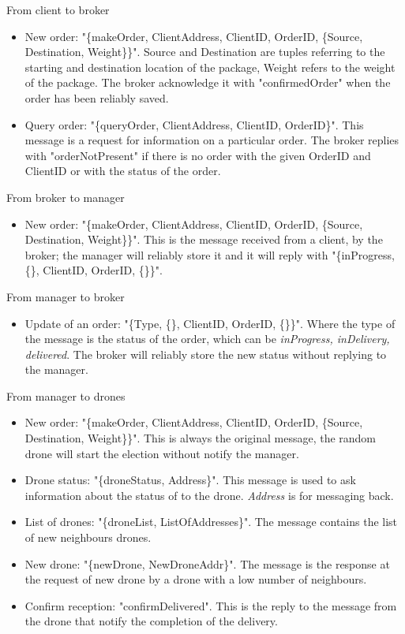 \documentclass[a4paper, oneside]{memoir}
\begin{document}
From client to broker
\begin{itemize}
	\item New order: "\{makeOrder, ClientAddress, ClientID, OrderID, \{Source, Destination, Weight\}\}".
	Source and Destination are tuples referring to the starting and destination location of the package, Weight refers to the weight of the package. The broker acknowledge it with "confirmedOrder" when the order has been reliably saved.

	\item Query order: "\{queryOrder, ClientAddress, ClientID, OrderID\}".
	This message is a request for information on a particular order. The broker replies with "orderNotPresent" if there is no order with the given OrderID and ClientID or with the status of the order.
\end{itemize} \vspace{1em}
From broker to manager
\begin{itemize}
	\item New order: "\{makeOrder, ClientAddress, ClientID, OrderID, \{Source, Destination, Weight\}\}".
	This is the message received from a client, by the broker; the manager will reliably store it and it will reply with "\{inProgress, \{\}, ClientID, OrderID, \{\}\}".
\end{itemize} \vspace{1em}
From manager to broker
\begin{itemize}
	\item Update of an order: "\{Type, \{\}, ClientID, OrderID, \{\}\}".
	Where the type of the message is the status of the order, which can be \textit{inProgress, inDelivery, delivered}. The broker will reliably store the new status without replying to the manager.
\end{itemize}\vspace{1em}
From manager to drones
\begin{itemize}
	\item New order: "\{makeOrder, ClientAddress, ClientID, OrderID, \{Source, Destination, Weight\}\}".
	This is always the original message, the random drone will start the election without notify the manager.

	\item Drone status: "\{droneStatus, Address\}".
	This message is used to ask information about the status of to the drone. \textit{Address} is for messaging back.


	\item List of drones: "\{droneList, ListOfAddresses\}".
	The message contains the list of new neighbours drones.

	\item New drone: "\{newDrone, NewDroneAddr\}".
	The message is the response at the request of new drone by a drone with a low number of neighbours.

	\item Confirm reception: "confirmDelivered".
	This is the reply to the message from the drone that notify the completion of the delivery.

\end{itemize} \vspace{1em}
\end{document}

